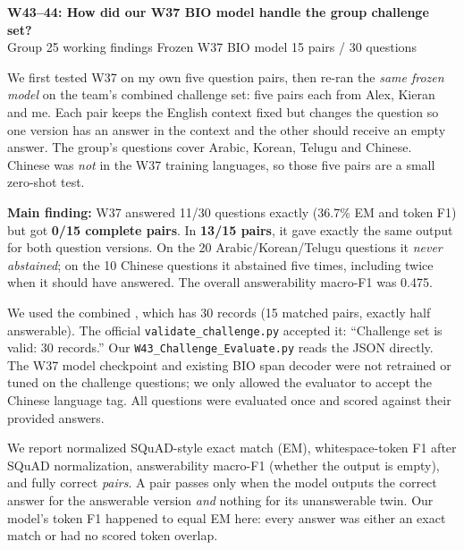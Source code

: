 \documentclass[10pt,a4paper]{article}
\newcommand{\sectionline}[1]{\vspace{5pt}{\large\bfseries #1}\par\vspace{1pt}}
\begin{document}
\fontsize{9.75}{12.5}\selectfont
\begin{center}
{\Large\bfseries W43--44: How did our W37 BIO model handle the group challenge set?}\\[3pt]
{\small Group 25 working findings \textbar{} Frozen W37 BIO model \textbar{} 15 pairs / 30 questions}
\end{center}
\vspace{-7pt}

\sectionline{Quick summary}

We first tested W37 on my own five question pairs, then re-ran the \emph{same frozen model} on the team's combined challenge set: five pairs each from Alex, Kieran and me. Each pair keeps the English context fixed but changes the question so one version has an answer in the context and the other should receive an empty answer. The group's questions cover Arabic, Korean, Telugu and Chinese. Chinese was \emph{not} in the W37 training languages, so those five pairs are a small zero-shot test.

\textbf{Main finding:} W37 answered 11/30 questions exactly (36.7\% EM and token F1) but got \textbf{0/15 complete pairs}. In \textbf{13/15 pairs}, it gave exactly the same output for both question versions. On the 20 Arabic/Korean/Telugu questions it \emph{never abstained}; on the 10 Chinese questions it abstained five times, including twice when it should have answered. The overall answerability macro-F1 was 0.475.

\sectionline{1. What was run?}

We used the combined , which has 30 records (15 matched pairs, exactly half answerable). The official \texttt{validate\_challenge.py} accepted it: ``Challenge set is valid: 30 records.'' Our \texttt{W43\_Challenge\_Evaluate.py} reads the JSON directly. The W37 model checkpoint and existing BIO span decoder were not retrained or tuned on the challenge questions; we only allowed the evaluator to accept the Chinese language tag. All questions were evaluated once and scored against their provided answers.

We report normalized SQuAD-style exact match (EM), whitespace-token F1 after SQuAD normalization, answerability macro-F1 (whether the output is empty), and fully correct \emph{pairs}. A pair passes only when the model outputs the correct answer for the answerable version \emph{and} nothing for its unanswerable twin. Our model's token F1 happened to equal EM here: every answer was either an exact match or had no scored token overlap.
\end{document}

